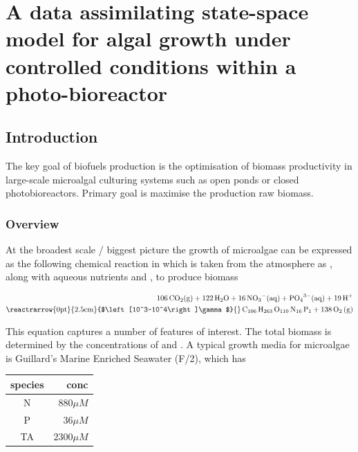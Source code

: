 \documentclass{ruthesis}
\begin{document}
\tableofcontents


\setcounter{chapter}{3}
\chapter{A data assimilating state-space model for algal growth under controlled conditions within a photo-bioreactor}\label{ch:micro_chapter}


\section{Introduction}\label{sec:micro_intro} 

The key goal of biofuels production is the optimisation of biomass productivity in large-scale microalgal culturing systems such as open ponds or closed photobioreactors. Primary goal is maximise the production raw biomass.  

\subsection{Overview} 
At the broadest scale / biggest picture the growth of microalgae can be expressed as the following chemical reaction in which  is taken from the atmosphere as , along with aqueous nutrients  and , to produce biomass

\begin{align*}
\ce{
 106 CO_2(g)  + 122 H_2O  + 16  NO_3^-(aq)  + PO_4^{3-}(aq)  + 19 H^+}\nonumber\\
 \ce{
  \reactrarrow{0pt}{2.5cm}{$\left[10^3-10^4\right]\gamma$}{} C_{106} H_{263} O_{110} N_{16} P_1 + 138 O_2 (g)}\\ 
\end{align*}%

This equation captures a number of features of interest.  The total biomass is determined by the concentrations of  and . A typical growth media for microalgae is Guillard's Marine Enriched Seawater (F/2), which has 
 
\begin{table}
\begin{tabular}{ |c|r|}
\textbf{species} & \textbf{conc} \\
\hline
N  &  $ 880   \mu M$ \\
P  &  $  36   \mu M$ \\
TA &  $2300   \mu M$
\end{tabular}
\end{table}
\end{document}
